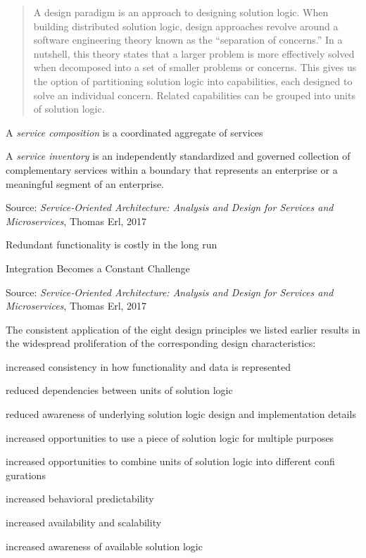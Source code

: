 \documentclass[Screen16to9,17pt]{foils}
\begin{document}

\begin{quote}
A design paradigm is an approach to designing solution logic. When building distributed solution logic, design approaches revolve around a software engineering theory known as the “separation of concerns.” In a nutshell, this theory states that a larger problem is more effectively solved when decomposed into a set of smaller problems or concerns. This gives us the option of partitioning solution logic into capabilities, each designed to solve an individual concern. Related capabilities can be grouped into units of solution logic.
\end{quote}

\begin{list2}
\item A \emph{service composition} is a coordinated aggregate of services
\item A \emph{service inventory} is an independently standardized and governed collection of complementary services within a boundary that represents an enterprise or a meaningful segment of an enterprise.
\end{list2}

Source: \emph{Service‑Oriented Architecture: Analysis and Design for Services and Microservices}, Thomas Erl, 2017




\begin{list2}
\item Redundant functionality is costly in the long run
\item Integration Becomes a Constant Challenge
\end{list2}

Source: \emph{Service‑Oriented Architecture: Analysis and Design for Services and Microservices}, Thomas Erl, 2017


The consistent application of the eight design principles we listed earlier results in the widespread proliferation of the corresponding design characteristics:

\begin{list2}
\item increased consistency in how functionality and data is represented
\item reduced dependencies between units of solution logic
\item reduced awareness of underlying solution logic design and implementation details
\item increased opportunities to use a piece of solution logic for multiple purposes
\item increased opportunities to combine units of solution logic into different
confi gurations
\item increased behavioral predictability
\item  increased availability and scalability
\item increased awareness of available solution logic
\end{list2}
\end{document}
